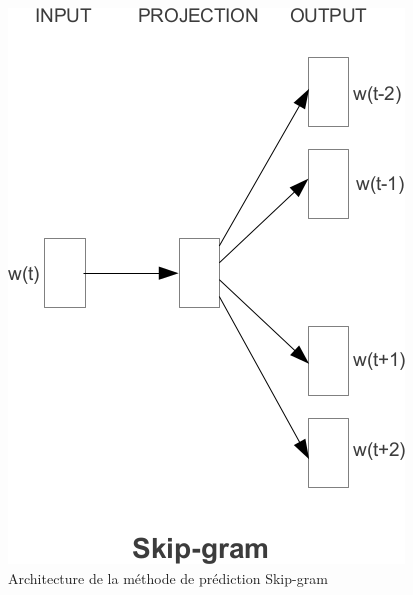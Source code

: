 \documentclass[11pt]{article}
\begin{document}
\begin{figure}[ht]
  \centering
  \includegraphics[width=\columnwidth]{skipgram}
  \caption{Architecture de la méthode de prédiction Skip-gram}
  \label{fig:skipgram}
\end{figure}
\end{document}
